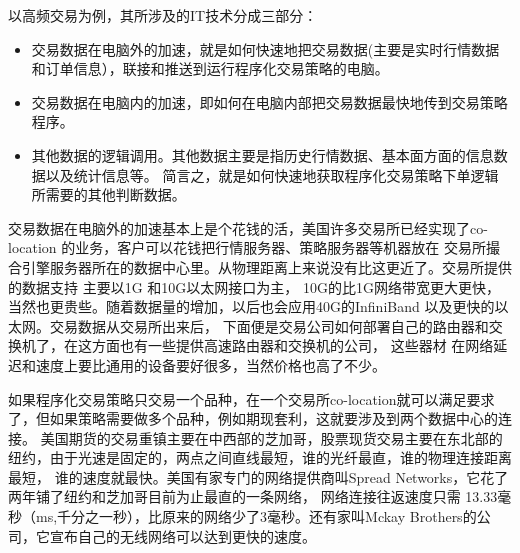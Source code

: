 以高频交易为例，其所涉及的IT技术分成三部分：
\begin{itemize}
\item 交易数据在电脑外的加速，就是如何快速地把交易数据(主要是实时行情数据和订单信息），联接和推送到运行程序化交易策略的电脑。
\item 交易数据在电脑内的加速，即如何在电脑内部把交易数据最快地传到交易策略程序。
\item 其他数据的逻辑调用。其他数据主要是指历史行情数据、基本面方面的信息数据以及统计信息等。
      简言之，就是如何快速地获取程序化交易策略下单逻辑所需要的其他判断数据。
\end{itemize}	 
交易数据在电脑外的加速基本上是个花钱的活，美国许多交易所已经实现了co-location 的业务，客户可以花钱把行情服务器、策略服务器等机器放在
交易所撮合引擎服务器所在的数据中心里。从物理距离上来说没有比这更近了。交易所提供的数据支持 主要以1G 和10G以太网接口为主，
10G的比1G网络带宽更大更快，当然也更贵些。随着数据量的增加，以后也会应用40G的InfiniBand 以及更快的以太网。交易数据从交易所出来后，
下面便是交易公司如何部署自己的路由器和交换机了，在这方面也有一些提供高速路由器和交换机的公司，
这些器材 在网络延迟和速度上要比通用的设备要好很多，当然价格也高了不少。
	  
如果程序化交易策略只交易一个品种，在一个交易所co-location就可以满足要求了，但如果策略需要做多个品种，例如期现套利，这就要涉及到两个数据中心的连接。
美国期货的交易重镇主要在中西部的芝加哥，股票现货交易主要在东北部的纽约，由于光速是固定的，两点之间直线最短，谁的光纤最直，谁的物理连接距离最短，
谁的速度就最快。美国有家专门的网络提供商叫Spread Networks，它花了两年铺了纽约和芝加哥目前为止最直的一条网络，
网络连接往返速度只需 13.33毫秒（ms,千分之一秒），比原来的网络少了3毫秒。还有家叫Mckay Brothers的公司，它宣布自己的无线网络可以达到更快的速度。
	   
